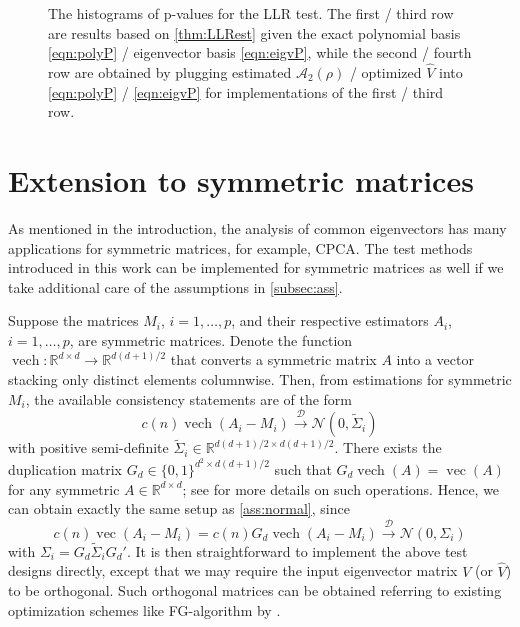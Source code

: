\documentclass[12pt]{article}
\numberwithin{equation}{section}
\numberwithin{table}{section}
\numberwithin{thm}{section}
\numberwithin{defn}{section}
\numberwithin{lem}{section}
\numberwithin{prop}{section}
\numberwithin{cor}{section}
\numberwithin{rem}{section}
\DeclareMathOperator{\Vector}{vec}
\DeclareMathOperator{\Vech}{vech}
\begin{document}
\begin{appendix}
\begin{figure}[htbp] %
    \centering
    \centerline{}
    \caption{The histograms of p-values for the LLR test. The first / third row are results based on \autoref{thm:LLRest} given the exact polynomial basis \eqref{eqn:polyP} / eigenvector basis \eqref{eqn:eigvP}, while the second / fourth row are obtained by plugging estimated $\mathcal{A}_2(\rho)$ / optimized $\widehat{V}$ into \eqref{eqn:polyP} / \eqref{eqn:eigvP} for implementations of the first / third row.}
   \label{fig:LLR}
\end{figure}






\section{Extension to symmetric matrices}
\label{sec:ext}

As mentioned in the introduction, the analysis of common eigenvectors has many applications for symmetric matrices, for example, CPCA. The test methods introduced in this work can be implemented for symmetric matrices as well if we take additional care of the assumptions in \autoref{subsec:ass}.

Suppose the matrices $M_i$, $i=1,\dots,p$, and their respective estimators $A_i$, $i=1,\dots,p$, are symmetric matrices. Denote the function $\Vech: \mathbb{R}^{d \times d} \to \mathbb{R}^{d(d+1)/2}$ that converts a symmetric matrix $A$ into a vector stacking only distinct elements columnwise. Then, from estimations for symmetric $M_i$, the available consistency statements are of the form
$$
c(n) \Vech(A_i - M_i) \xrightarrow{\mathcal{D}} \mathcal{N}(0, \widetilde{\Sigma}_i)
$$
with positive semi-definite $\widetilde{\Sigma}_i \in \mathbb{R}^{d(d+1)/2 \times d(d+1)/2}$. There exists the duplication matrix $G_d \in \{0, 1\}^{d^2 \times d(d+1)/2}$ such that $G_d \Vech(A) = \Vector(A)$ for any symmetric $A \in \mathbb{R}^{d \times d}$; see \cite{magnus2019matrix} for more details on such operations. Hence, we can obtain exactly the same setup as \autoref{ass:normal}, since
$$
c(n) \Vector(A_i - M_i) = c(n) G_d \Vech(A_i - M_i) \xrightarrow{\mathcal{D}} \mathcal{N}(0, \Sigma_i)
$$
with $\Sigma_i = G_d \widetilde{\Sigma}_i G_d'$. It is then straightforward to implement the above test designs directly, except that we may require the input eigenvector matrix $V$ (or $\widehat{V}$) to be orthogonal. Such orthogonal matrices can be obtained referring to existing optimization schemes like FG-algorithm by \cite{Flury86}.


\end{appendix}
\end{document}
